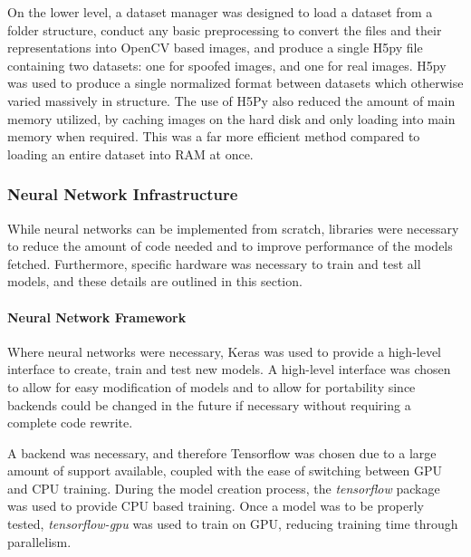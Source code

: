\documentclass[12pt,a4paper]{article}
\begin{document}
        On the lower level, a dataset manager was designed to load a dataset from a folder structure, conduct any basic preprocessing to convert the files and their representations into OpenCV based images, and produce a single H5py file containing two datasets: one for spoofed images, and one for real images. H5py was used to produce a single normalized format between datasets which otherwise varied massively in structure. The use of H5Py also reduced the amount of main memory utilized, by caching images on the hard disk and only loading into main memory when required. This was a far more efficient method compared to loading an entire dataset into RAM at once.

        \subsubsection{Neural Network Infrastructure}
            While neural networks can be implemented from scratch, libraries were necessary to reduce the amount of code needed and to improve performance of the models fetched.
            Furthermore, specific hardware was necessary to train and test all models, and these details are outlined in this section.

            \paragraph{Neural Network Framework} 
            Where neural networks were necessary, Keras was used to provide a high-level interface to create, train and test new models. A high-level interface was chosen to allow for easy modification of models and to allow for portability since backends could be changed in the future if necessary without requiring a complete code rewrite.

            A backend was necessary, and therefore Tensorflow was chosen due to a large amount of support available, coupled with the ease of switching between GPU and CPU training. During the model creation process, the \emph{tensorflow} package was used to provide CPU based training. Once a model was to be properly tested, \emph{tensorflow-gpu} was used to train on GPU, reducing training time through parallelism.  
\end{document}

